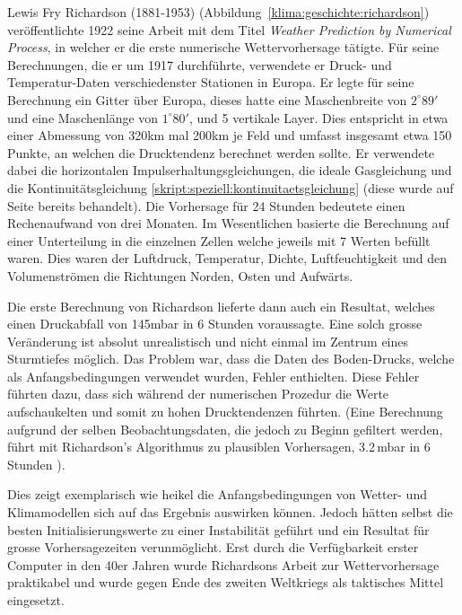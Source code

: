 \begin{refsection}
Lewis Fry Richardson (1881-1953)
(Abbildung~\ref{klima:geschichte:richardson}) veröffentlichte 1922
seine Arbeit mit dem Titel {\em Weather Prediction by Numerical
Process}, in welcher er die erste numerische Wettervorhersage
tätigte. Für seine Berechnungen, die er um 1917 durchführte,
verwendete er Druck- und Temperatur-Daten verschiedenster Stationen
in Europa. Er legte für seine Berechnung ein Gitter über Europa,
dieses hatte eine Maschenbreite von $2^\circ 89'$ und eine Maschenlänge
von $1^\circ 80'$, und 5 vertikale Layer. Dies entspricht in etwa einer
Abmessung von 320km mal 200km je Feld und umfasst insgesamt etwa
150 Punkte, an welchen die Drucktendenz berechnet werden sollte.
Er verwendete dabei die horizontalen Impulserhaltungsgleichungen,
die ideale Gasgleichung und die Kontinuitätsgleichung
\eqref{skript:speziell:kontinuitaetsgleichung} (diese wurde auf
Seite \pageref{skript:speziell:kontinuitaetsgleichung} bereits
behandelt). Die Vorhersage für 24 Stunden bedeutete einen Rechenaufwand
von drei Monaten. Im Wesentlichen basierte die Berechnung auf einer
Unterteilung in die einzelnen Zellen welche jeweils mit 7 Werten
befüllt waren. Dies waren der Luftdruck, Temperatur, Dichte,
Luftfeuchtigkeit und den Volumenströmen die Richtungen Norden, Osten
und Aufwärts.

Die erste Berechnung von Richardson lieferte dann auch ein Resultat,
welches einen Druckabfall von 145mbar in 6 Stunden voraussagte.
Eine solch grosse Veränderung ist absolut unrealistisch und nicht
einmal im Zentrum eines Sturmtiefes möglich. Das Problem war, dass
die Daten des Boden-Drucks, welche als Anfangsbedingungen verwendet
wurden, Fehler enthielten. Diese Fehler führten dazu, dass sich
während der numerischen Prozedur die Werte aufschaukelten und somit
zu hohen Drucktendenzen führten. (Eine Berechnung aufgrund der
selben Beobachtungsdaten, die jedoch zu Beginn gefiltert werden,
führt mit Richardson's Algorithmus zu plausiblen Vorhersagen,
3.2\,mbar in 6 Stunden \cite{klima:stocker}).

Dies zeigt exemplarisch wie heikel die Anfangsbedingungen von Wetter-
und Klimamodellen sich auf das Ergebnis auswirken können. Jedoch
hätten selbst die besten Initialisierungswerte zu einer Instabilität
geführt und ein Resultat für grosse Vorhersagezeiten verunmöglicht.
Erst durch die Verfügbarkeit erster Computer in den 40er Jahren
wurde Richardsons Arbeit zur  Wettervorhersage praktikabel und wurde
gegen Ende des zweiten Weltkriegs als taktisches Mittel eingesetzt.


\end{refsection}
